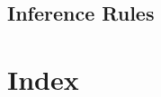 \documentclass[letterpaper,10pt,english]{sphinxmanual}
\begin{document}
\begin{sphinxVerbatim}[commandchars=\\\{\}]
   
\end{sphinxVerbatim}


\section{Inference Rules}
\label{\detokenize{A_02_Predicate_Logic:inference-rules}}
\begin{sphinxVerbatim}[commandchars=\\\{\}]
   
\end{sphinxVerbatim}

\sphinxstepscope


\chapter{Index}
\label{\detokenize{genindex:index}}\label{\detokenize{genindex::doc}}


\renewcommand{\indexname}{Index}
\printindex
\end{document}

